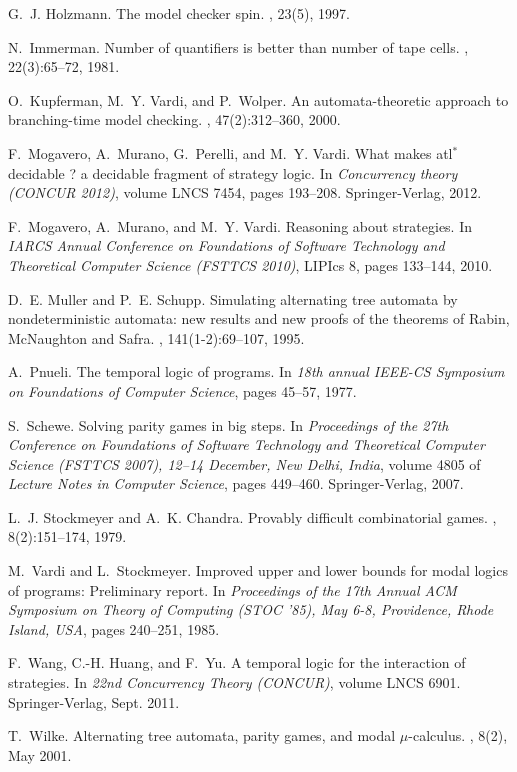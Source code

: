 \documentclass{llncs}
\begin{document}
\begin{thebibliography}{10}
G.~J. Holzmann.
\newblock The model checker spin.
, 23(5), 1997.

N.~Immerman.
\newblock Number of quantifiers is better than number of tape cells.
, 22(3):65--72, 1981.

O.~Kupferman, M.~Y. Vardi, and P.~Wolper.
\newblock An automata-theoretic approach to branching-time model checking.
, 47(2):312--360, 2000.

F.~Mogavero, A.~Murano, G.~Perelli, and M.~Y. Vardi.
\newblock What makes atl$^*$ decidable ? a decidable fragment of strategy
  logic.
\newblock In {\em Concurrency theory (CONCUR 2012)}, volume LNCS 7454, pages
  193--208. Springer-Verlag, 2012.

F.~Mogavero, A.~Murano, and M.~Y. Vardi.
\newblock Reasoning about strategies.
\newblock In {\em IARCS Annual Conference on Foundations of Software Technology
  and Theoretical Computer Science (FSTTCS 2010)}, LIPIcs 8, pages 133--144, 2010.

D.~E. Muller and P.~E. Schupp.
\newblock Simulating alternating tree automata by nondeterministic automata:
  new results and new proofs of the theorems of {Rabin}, {McNaughton} and
  {Safra}.
, 141(1-2):69--107, 1995.

A.~Pnueli.
\newblock The temporal logic of programs.
\newblock In {\em 18th annual IEEE-CS Symposium on Foundations of Computer
  Science}, pages 45--57, 1977.

S.~Schewe.
\newblock Solving parity games in big steps.
\newblock In {\em Proceedings of the 27th Conference on Foundations of Software
  Technology and Theoretical Computer Science (FSTTCS 2007), 12--14 December,
  New Delhi, India}, volume 4805 of {\em Lecture Notes in Computer Science},
  pages 449--460. Springer-Verlag, 2007.

L.~J. Stockmeyer and A.~K. Chandra.
\newblock Provably difficult combinatorial games.
, 8(2):151--174, 1979.

M.~Vardi and L.~Stockmeyer.
\newblock Improved upper and lower bounds for modal logics of programs:
  Preliminary report.
\newblock In {\em Proceedings of the 17th Annual ACM Symposium on Theory of
  Computing (STOC '85), May 6-8, Providence, Rhode Island, USA}, pages
  240--251, 1985.

F.~Wang, C.-H. Huang, and F.~Yu.
\newblock A temporal logic for the interaction of strategies.
\newblock In {\em 22nd Concurrency Theory (CONCUR)}, volume LNCS 6901.
  Springer-Verlag, Sept. 2011.

T.~Wilke.
\newblock Alternating tree automata, parity games, and modal $\mu$-calculus.
, 8(2), May 2001.

\end{thebibliography}
\end{document}
